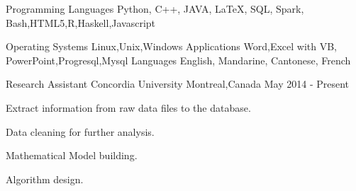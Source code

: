 \documentclass[11pt, a4paper]{awesome-cv} %
\begin{document}
\begin{cvskills}
	
	
	\cvskill
	{Programming Languages} %
	{Python, C++,  JAVA, LaTeX, SQL, Spark, Bash,HTML5,R,Haskell,Javascript} %
	
	\cvskill
	{Operating Systems}
	{Linux,Unix,Windows}
	\cvskill
	{Applications}
	{Word,Excel with VB, PowerPoint,Progresql,Mysql}
	\cvskill
	{Languages} %
	{English, Mandarine, Cantonese, French} %
	
	
\end{cvskills}




\begin{cventries}
	
	
	\cventry
	{Research Assistant} %
	{Concordia University} %
	{Montreal,Canada} %
	{May 2014 - Present} %
	{ %
		\begin{cvitems}
			\item {Extract information from raw data files to the database.}
			\item {Data cleaning for further analysis.}
			\item {Mathematical Model building.}
			\item {Algorithm design.}
		\end{cvitems}
	}
	
	

	
\end{cventries}
\end{document}
